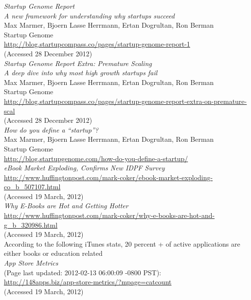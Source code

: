 \documentclass[a4paper,10pt]{book}
\begin{document}
\begin{thebibliography}{9}
  
 
 
  \emph{Startup Genome Report\\
	A new framework for understanding why startups succeed}\\
    Max Marmer, Bjoern Lasse Herrmann, Ertan Dogrultan, Ron Berman\\
    Startup Genome\\
  \url{http://blog.startupcompass.co/pages/startup-genome-report-1}\\
  (Accessed 28 December 2012)\\

  \emph{Startup Genome Report Extra: Premature Scaling\\
	A deep dive into why most high growth startups fail}\\
    Max Marmer, Bjoern Lasse Herrmann, Ertan Dogrultan, Ron Berman\\
    Startup Genome\\
  \url{http://blog.startupcompass.co/pages/startup-genome-report-extra-on-premature-scal}\\
  (Accessed 28 December 2012)\\

  
  \emph{How do you define a “startup”?}\\
    Max Marmer, Bjoern Lasse Herrmann, Ertan Dogrultan, Ron Berman\\
    Startup Genome\\
  \url{http://blog.startupgenome.com/how-do-you-define-a-startup/}\\

  
   \emph{eBook Market Exploding, Confirms New IDPF Survey}\\
   \url{http://www.huffingtonpost.com/mark-coker/ebook-market-exploding-co_b_507107.html}\\
  (Accessed 19 March, 2012)\\

   \emph{Why E-Books are Hot and Getting Hotter}\\
  \url{http://www.huffingtonpost.com/mark-coker/why-e-books-are-hot-and-g_b_320986.html}\\
 (Accessed 19 March, 2012)\\

   According to the following iTunes stats, 20 percent + of active applications are either books or education related \\
   \emph{App Store Metrics}\\
   (Page last updated: 2012-02-13 06:00:09 -0800 PST): \\
   \url{http://148apps.biz/app-store-metrics/?mpage=catcount} \\
  (Accessed 19 March, 2012)\\
 

\end{thebibliography}
\end{document}
